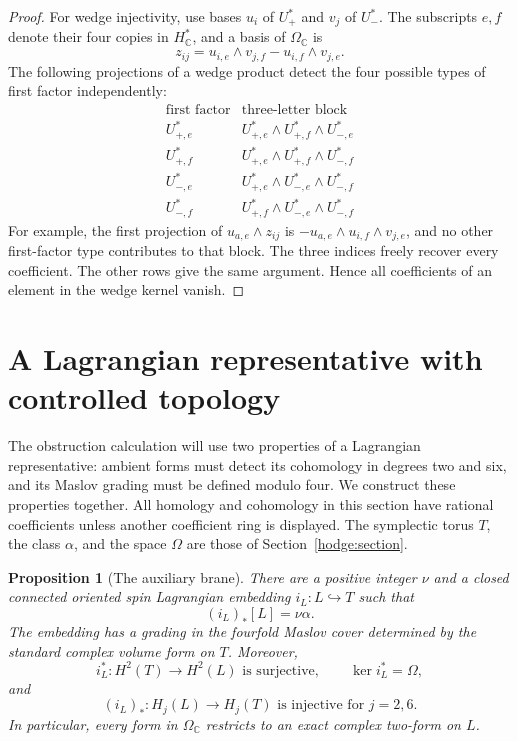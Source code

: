 \documentclass[11pt]{article}
\newtheorem{proposition}[theorem]{Proposition}
\theoremstyle{definition}
\theoremstyle{remark}
\newcommand{\C}{\mathbb C}
\numberwithin{equation}{section}
\begin{document}
\begin{proof}
For wedge injectivity, use bases $u_i$ of $U_+^*$ and $v_j$ of $U_-^*$.
The subscripts $e,f$ denote their four copies in $H_\C^*$, and a basis
of $\Omega_\C$ is
\[
 z_{ij}=u_{i,e}\wedge v_{j,f}-u_{i,f}\wedge v_{j,e}.
\]
The following projections of a wedge product detect the four possible
types of first factor independently:
\[
\begin{array}{c|c}
 \text{first factor}&\text{three-letter block}\\ \hline
 U_{+,e}^*&U_{+,e}^*\wedge U_{+,f}^*\wedge U_{-,e}^*\\
 U_{+,f}^*&U_{+,e}^*\wedge U_{+,f}^*\wedge U_{-,f}^*\\
 U_{-,e}^*&U_{+,e}^*\wedge U_{-,e}^*\wedge U_{-,f}^*\\
 U_{-,f}^*&U_{+,f}^*\wedge U_{-,e}^*\wedge U_{-,f}^*
\end{array}
\]
For example, the first projection of $u_{a,e}\wedge z_{ij}$ is
$-u_{a,e}\wedge u_{i,f}\wedge v_{j,e}$, and no other first-factor
type contributes to that block.  The three indices freely recover
every coefficient.  The other rows give the same argument.  Hence all
coefficients of an element in the wedge kernel vanish.
\end{proof}

\section{A Lagrangian representative with controlled topology}
\label{top:section}

The obstruction calculation will use two properties of a Lagrangian
representative: ambient forms must detect its cohomology in degrees two
and six, and its Maslov grading must be defined modulo four.  We construct
these properties together.  All homology and cohomology in this section
have rational coefficients unless another coefficient ring is displayed.
The symplectic torus $T$, the class $\alpha$, and the space $\Omega$ are
those of Section~\ref{hodge:section}.

\begin{proposition}[The auxiliary brane]
\label{top:brane}
There are a positive integer $\nu$ and a closed connected oriented spin
Lagrangian embedding $i_L:L\hookrightarrow T$ such that
\begin{equation}\label{top:brane-class}
 (i_L)_*[L]=\nu\alpha.
\end{equation}
The embedding has a grading in the fourfold Maslov cover determined by
the standard complex volume form on $T$.  Moreover,
\begin{equation}\label{top:brane-cohomology}
 i_L^*:H^2(T)\longrightarrow H^2(L)
 \text{ is surjective},\qquad \ker i_L^*=\Omega,
\end{equation}
and
\begin{equation}\label{top:brane-injections}
 (i_L)_*:H_j(L)\longrightarrow H_j(T)
 \text{ is injective for }j=2,6.
\end{equation}
In particular, every form in $\Omega_{\C}$ restricts to an exact complex
two-form on $L$.
\end{proposition}
\end{document}
